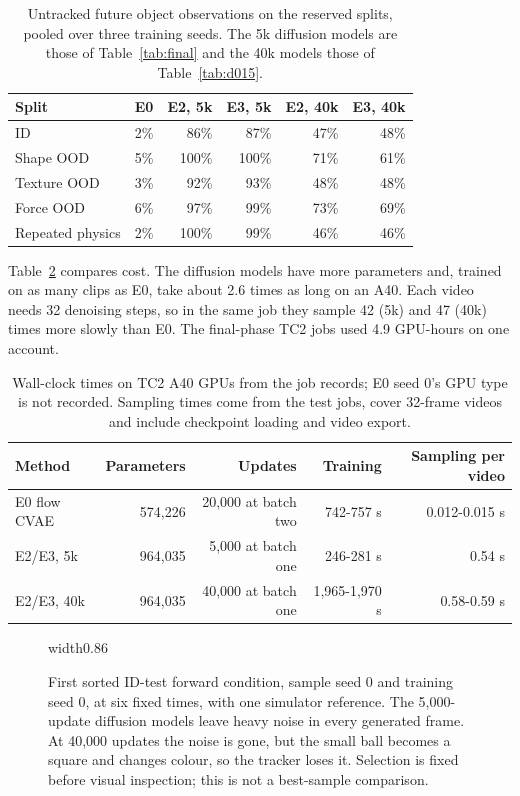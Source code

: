 \documentclass[11pt,a4paper]{article}
\begin{document}
\begin{table}[!ht]
\centering
\begin{tabular}{lrrrrr}
\hline
Split & E0 & E2, 5k & E3, 5k & E2, 40k & E3, 40k \\
\hline
ID & 2\% & 86\% & 87\% & 47\% & 48\% \\
Shape OOD & 5\% & 100\% & 100\% & 71\% & 61\% \\
Texture OOD & 3\% & 92\% & 93\% & 48\% & 48\% \\
Force OOD & 6\% & 97\% & 99\% & 73\% & 69\% \\
Repeated physics & 2\% & 100\% & 99\% & 46\% & 46\% \\
\hline
\end{tabular}
\caption{Untracked future object observations on the reserved splits, pooled over three training seeds. The 5k diffusion models are those of Table~\ref{tab:final} and the 40k models those of Table~\ref{tab:d015}.}
\label{tab:split_tracking}
\end{table}

Table~\ref{tab:cost} compares cost. The diffusion models have more parameters and, trained on as many clips as E0, take about 2.6 times as long on an A40. Each video needs 32 denoising steps, so in the same job they sample 42 (5k) and 47 (40k) times more slowly than E0. The final-phase TC2 jobs used 4.9 GPU-hours on one account.

\begin{table}[!ht]
\centering
\small
\begin{tabular}{lrrrr}
\hline
Method & Parameters & Updates & Training & Sampling per video \\
\hline
E0 flow CVAE & 574,226 & 20,000 at batch two & 742-757 s & 0.012-0.015 s \\
E2/E3, 5k & 964,035 & 5,000 at batch one & 246-281 s & 0.54 s \\
E2/E3, 40k & 964,035 & 40,000 at batch one & 1,965-1,970 s & 0.58-0.59 s \\
\hline
\end{tabular}
\caption{Wall-clock times on TC2 A40 GPUs from the job records; E0 seed 0's GPU type is not recorded. Sampling times come from the test jobs, cover 32-frame videos and include checkpoint loading and video export.}
\label{tab:cost}
\end{table}

\begin{figure}[!ht]
\centering
\pdfximage width0.86\linewidth{report/figures/final_heldout.png}\pdfrefximage\pdflastximage
\caption{First sorted ID-test forward condition, sample seed 0 and training seed 0, at six fixed times, with one simulator reference. The 5,000-update diffusion models leave heavy noise in every generated frame. At 40,000 updates the noise is gone, but the small ball becomes a square and changes colour, so the tracker loses it. Selection is fixed before visual inspection; this is not a best-sample comparison.}
\label{fig:final}
\end{figure}
\end{document}
